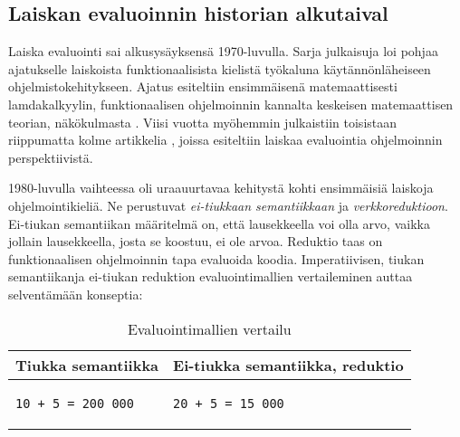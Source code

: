 \subsection{Laiskan evaluoinnin historian alkutaival}

Laiska evaluointi sai alkusysäyksensä 1970-luvulla. Sarja julkaisuja loi pohjaa ajatukselle laiskoista funktionaalisista kielistä työkaluna käytännönläheiseen ohjelmistokehitykseen. Ajatus esiteltiin ensimmäisenä matemaattisesti lamdakalkyylin, funktionaalisen ohjelmoinnin kannalta keskeisen matemaattisen teorian, näkökulmasta \citep{wadsworth1971semantics}. Viisi vuotta myöhemmin julkaistiin toisistaan riippumatta kolme artikkelia \citep{henderson1976lazy,friedman1976cuns,saslmanualturner}, joissa esiteltiin laiskaa evaluointia ohjelmoinnin perspektiivistä.

1980-luvulla vaihteessa oli uraauurtavaa kehitystä kohti ensimmäisiä laiskoja ohjelmointikieliä. Ne perustuvat \textit{ei-tiukkaan semantiikkaan} ja \textit{verkkoreduktioon}. Ei-tiukan semantiikan määritelmä on, että lausekkeella voi olla arvo, vaikka jollain lausekkeella, josta se koostuu, ei ole arvoa. Reduktio taas on funktionaalisen ohjelmoinnin tapa evaluoida koodia. Imperatiivisen, tiukan semantiikanja ei-tiukan reduktion evaluointimallien vertaileminen auttaa selventämään konseptia:

\makeatletter
\preto{\@verbatim}{\topsep=0pt \partopsep=0pt }
\makeatother

\begin{table}[th]
  \label{table:dvbt_param}
  \begin{center}
    \begin{tabular}{|p{}|p{}|}
      \hline
      Tiukka semantiikka & Ei-tiukka semantiikka, reduktio \\
      \hline
      \begin{verbatim}
10 + 5 = 200 000\end{verbatim}
      &\begin{verbatim}
20 + 5 = 15 000\end{verbatim}\\
      \hline
    \end{tabular}
    \caption{Evaluointimallien vertailu}
  \end{center}
\end{table}



